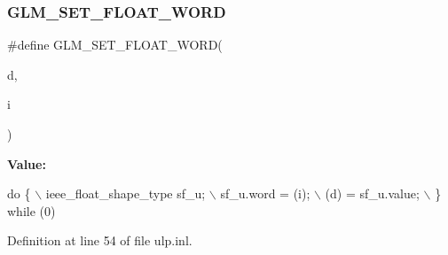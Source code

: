 \subsubsection{\texorpdfstring{G\+L\+M\+\_\+\+S\+E\+T\+\_\+\+F\+L\+O\+A\+T\+\_\+\+W\+O\+RD}{GLM\_SET\_FLOAT\_WORD}}
{\footnotesize\ttfamily \#define G\+L\+M\+\_\+\+S\+E\+T\+\_\+\+F\+L\+O\+A\+T\+\_\+\+W\+O\+RD(\begin{DoxyParamCaption}\item[{}]{d,  }\item[{}]{i }\end{DoxyParamCaption})}

{\bfseries Value\+:}
\begin{DoxyCode}
\textcolor{keywordflow}{do} \{                                    \(\backslash\)
        ieee\_float\_shape\_type sf\_u;         \(\backslash\)
        sf\_u.word = (i);                    \(\backslash\)
        (d) = sf\_u.value;                   \(\backslash\)
    \} \textcolor{keywordflow}{while} (0)
\end{DoxyCode}


Definition at line 54 of file ulp.\+inl.

